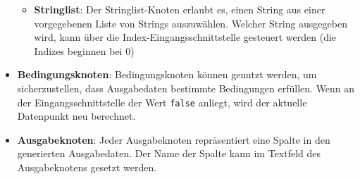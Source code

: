 \begin{itemize}
\begin{itemize}
        \item \textbf{Stringlist}: Der Stringlist-Knoten erlaubt es, einen String aus einer vorgegebenen Liste von Strings auszuwählen. Welcher String ausgegeben wird, kann über die Index-Eingangsschnittstelle gesteuert werden (die Indizes beginnen bei 0)
    \end{itemize}
    \item \textbf{Bedingungsknoten}: Bedingungsknoten können genutzt werden, um sicherzustellen, dass Ausgabedaten bestimmte Bedingungen erfüllen. Wenn an der Eingangsschnittstelle der Wert \texttt{false} anliegt, wird der aktuelle Datenpunkt neu berechnet.
    \item \textbf{Ausgabeknoten}: Jeder Ausgabeknoten repräsentiert eine Spalte in den generierten Ausgabedaten. Der Name der Spalte kann im Textfeld des Ausgabeknotens gesetzt werden.
\end{itemize}